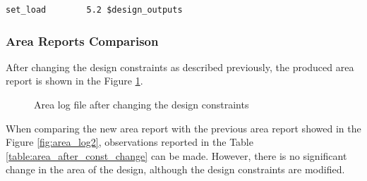 \documentclass[a4paper,11pt]{article}%
\begin{document}
\begin{Verbatim}[frame=single]
set_load        5.2 $design_outputs
\end{Verbatim}

\subsubsection{Area Reports Comparison}

After changing the design constraints as described previously, the produced area report is shown in the Figure \ref{fig:area_log3}.

\begin{figure}[h]
	\centering
	\caption{Area log file after changing the design constraints}
	\label{fig:area_log3}
\end{figure}

When comparing the new area report with the previous area report showed in the Figure \ref{fig:area_log2}, observations reported in the Table \ref{table:area_after_const_change} can be made. However, there is no significant change in the area of the design, although the design constraints are modified.
\end{document}
